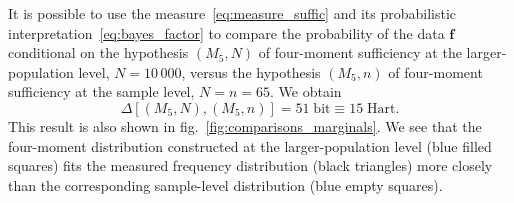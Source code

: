 \documentclass[\ifafour a4paper,12pt,\else a5paper,10pt,\fi%
onecolumn,oneside,article,%
british%
]{memoir}
\theoremstyle{remark}
\theoremstyle{innote}
\newcommand*{\citep}{\footcites}
\newcommand*{\amp}{\&}
\renewcommand*{\|}{\nonscript\,\vert\nonscript\;\mathopen{}}
\newcommand*{\sect}{\S}%
\newcommand*{\chap}{ch.}%
\newcommand*{\fig}{fig.}%
\newcommand*{\eg}{{e.g.}}
\newcommand*{\etal}{{et al.}}
\newcommand*{\puzzle}{{\fontencoding{U}\fontfamily{fontawesometwo}\selectfont\symbol{225}}}
\newcommand{\mynote}[1]{ {\color{notecolour}\puzzle\ #1}}
\newcommand*{\yff}{f}
\newcommand*{\yf}{\bm{\yff}}
\newcommand*{\ydi}{\varDelta}
\newcommand*{\bit}{\textrm{bit}}
\newcommand*{\hart}{\textrm{Hart}}
\begin{document}
It is possible to use the measure~\eqref{eq:measure_suffic} and its
probabilistic interpretation~\eqref{eq:bayes_factor} to compare the
probability of the data $\yf$ conditional on the hypothesis $(M_{5},N)$ of
four-moment sufficiency at the larger-population level, $N=10\,000$, versus
the hypothesis $(M_{5}, n)$ of four-moment sufficiency at the sample level,
$N=n=65$. We obtain
\begin{equation}
  \label{eq:diff_suff_n}
  \ydi[(M_{5}, N), (M_{5}, n)] = 51\;\bit \equiv 15\;\hart.
\end{equation}
This result is also shown in
\fig~\ref{fig:comparisons_marginals}. We see that the four-moment
distribution constructed at the larger-population level
(\textcolor{myblue}{blue filled squares}) fits the measured frequency
distribution (black triangles) more closely than the corresponding
sample-level distribution (\textcolor{myblue}{blue empty squares}).



\bigskip



\end{document}
